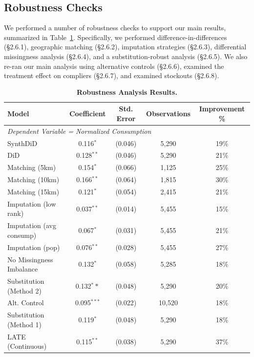 \documentclass[12pt]{article}
\begin{document}
\subsection{Robustness Checks}
\label{sup:robustnesschecks}

We performed a number of robustness checks to support our main results, summarized in Table~\ref{tab:all_appendix}. Specifically, we performed difference-in-differences (\S2.6.1), geographic matching (\S2.6.2), imputation strategies (\S2.6.3), differential missingness analysis (\S2.6.4), and a substitution-robust analysis (\S2.6.5). We also re-ran our main analysis using alternative controls (\S2.6.6), examined the treatment effect on compliers (\S2.6.7), and examined stockouts (\S2.6.8).


\begin{table}[t]
\centering
\caption{\textbf{Robustness Analysis Results.}}
\label{tab:all_appendix}
\begin{threeparttable}
\small
\begin{tabular}{l c c c c}
\toprule
\textbf{Model} & \textbf{Coefficient} & \textbf{Std. Error} & \textbf{Observations} & \textbf{Improvement \%} \\
\midrule
\multicolumn{5}{l}{\textit{Dependent Variable = Normalized Consumption}} \\
\midrule
SynthDiD & 0.116$^{*}$ & (0.046) & 5,290 & 19\% \\
DiD & 0.128$^{**}$ & (0.046) & 5,290 & 21\% \\
Matching (5km) & 0.154$^{*}$ & (0.066) & 1,125 & 25\% \\
Matching (10km) & 0.166$^{**}$ & (0.064) & 1,815 & 30\% \\
Matching (15km) & 0.121$^{*}$ & (0.054) & 2,415 & 21\% \\
Imputation (low rank) & 0.037$^{**}$ & (0.014) & 5,455 & 15\% \\
Imputation (avg consump) & 0.067$^{*}$ & (0.031) & 5,455 & 21\% \\
Imputation (pop) & 0.076$^{**}$ & (0.028) & 5,455 & 27\% \\
No Missingness Imbalance & 0.132$^*$ & (0.058) & 5,285 & 18\% \\
Substitution (Method 2) & 0.132$^**$ & (0.048) & 5,290 & 20\% \\
Alt. Control & 0.095$^{***}$ & (0.022) & 10,520 & 18\% \\
Substitution (Method 1) & 0.119$^*$ & (0.048) & 5,290 & 18\% \\
LATE (Continuous) & 0.115$^{**}$ & (0.038) & 5,290 & 37\% \\

\end{tabular}
\end{threeparttable}
\end{table}
\end{document}
